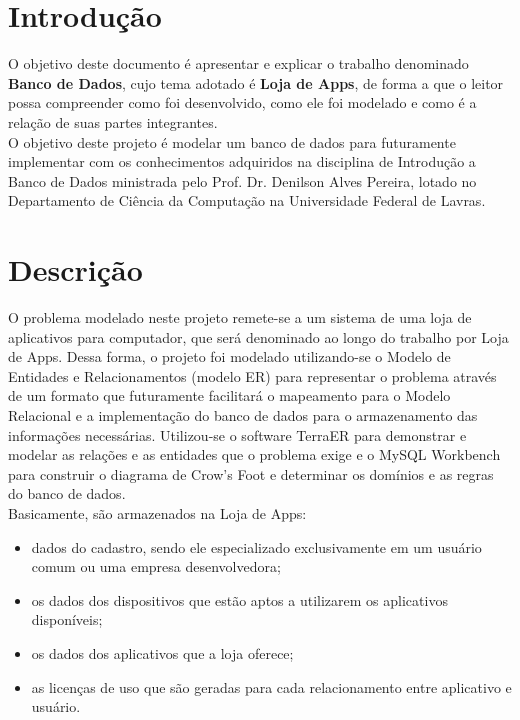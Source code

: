 \begingroup

\section{Introdução}
\vspace{5mm}


O objetivo deste documento é apresentar e explicar o trabalho denominado \textbf{Banco de Dados}, cujo tema adotado é \textbf{Loja de Apps}, de forma a que o leitor possa compreender como foi desenvolvido, como ele foi modelado e como é a relação de suas partes integrantes.\\

O objetivo deste projeto é modelar um banco de dados para futuramente implementar com os conhecimentos adquiridos na disciplina de Introdução a Banco de Dados ministrada pelo Prof. Dr. Denilson Alves Pereira, lotado no Departamento de Ciência da Computação na Universidade Federal de Lavras.\\



\section{Descrição}
\vspace{5mm}


O problema modelado neste projeto remete-se a um sistema de uma loja de aplicativos para computador, que será denominado ao longo do trabalho por Loja de Apps. Dessa forma, o projeto foi modelado utilizando-se o Modelo de Entidades e Relacionamentos (modelo ER) para representar o problema através de um formato que futuramente facilitará o mapeamento para o Modelo Relacional e a implementação do banco de dados para o armazenamento das informações necessárias. Utilizou-se o software TerraER para demonstrar e modelar as relações e as entidades que o problema exige e o MySQL Workbench para construir o diagrama de Crow's Foot e determinar os domínios e as regras do banco de dados.\\

Basicamente, são armazenados na Loja de Apps:

\begin{itemize}

\item dados do cadastro, sendo ele especializado exclusivamente em um usuário comum ou uma empresa desenvolvedora;
\item os dados dos dispositivos que estão aptos a utilizarem os aplicativos disponíveis;
\item os dados dos aplicativos que a loja oferece;
\item as licenças de uso que são geradas para cada relacionamento entre aplicativo e usuário.

\end{itemize}


